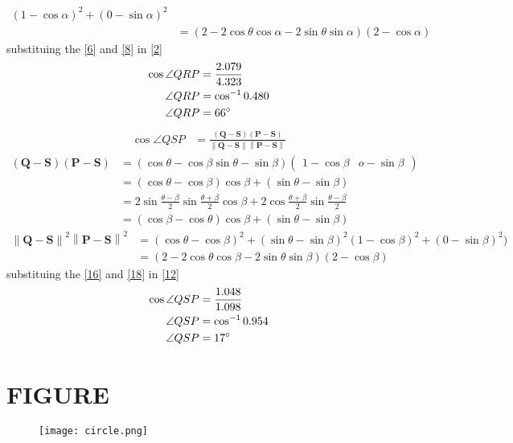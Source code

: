 \documentclass[12pt]{article}
\providecommand{\brak}[1]{\ensuremath{\left(#1\right)}}
\providecommand{\norm}[1]{\left\lVert#1\right\rVert}
\newcommand{\myvec}[1]{\ensuremath{\begin{pmatrix}#1\end{pmatrix}}}
\let\vec\mathbf
\begin{document}
\begin{enumerate}
\begin{align}
	\brak{1-\cos\alpha}^2+\brak{0-\sin\alpha}^2\\
	&=\brak{2-2\cos\theta\cos\alpha-2\sin\theta\sin\alpha}\brak{2-\cos\alpha}\label{8}
\end{align}
substituing the \eqref{6} and \eqref{8} in \eqref{2}
\begin{align}
\cos\angle QRP&=\frac{2.079}{4.323}\\
\angle QRP&=\cos^{-1}0.480\\
\angle QRP&=66\degree
\end{align}
\begin{align}
\cos\angle QSP&= \frac{\brak{\vec{Q}-\vec{S}}\brak{\vec{P}-\vec{S}}}{\norm{\vec{Q}-\vec{S}}\norm{\vec{P}-\vec{S}}}\label{12}
\end{align}
\begin{align}
\brak{\vec{Q}-\vec{S}}\brak{\vec{P}-\vec{S}}&= \brak{\cos\theta-\cos\beta \sin\theta-\sin\beta}\myvec{1-\cos\beta &o-\sin\beta}\\
&=\brak{\cos\theta-\cos\beta}\cos\beta+\brak{\sin\theta-\sin\beta}\\
&=2\sin\frac{\theta-\beta}{2}\sin\frac{\theta+\beta}{2}\cos\beta+2\cos\frac{\theta+\beta}{2}\sin\frac{\theta-\beta}{2}\\
&=\brak{\cos\beta-\cos\theta}\cos\beta+\brak{\sin\theta-\sin\beta}\label{16}
\end{align}
\begin{align}
\norm{\vec{Q}-\vec{S}}^2\norm{\vec{P}-\vec{S}}^2 &= \brak{\cos\theta-\cos\beta}^2+\brak{\sin\theta-\sin\beta}^2
	\brak{1-\cos\beta}^2+\brak{0-\sin\beta}^2)\\
	&=\brak{2-2\cos\theta\cos\beta-2\sin\theta\sin\beta}\brak{2-\cos\beta}\label{18}
\end{align}
substituing the \eqref{16} and \eqref{18} in \eqref{12}
\begin{align}
\cos\angle QSP&=\frac{1.048}{1.098}\\
\angle QSP&=\cos^{-1}0.954\\
\angle QSP&=17\degree
\end{align}
\section{FIGURE}
\begin{figure}[h]
\centering
\texttt{[image: circle.png]}
\caption{}
		\label{fig:Figure}
\end{figure}
\end{enumerate}
\end{document}
